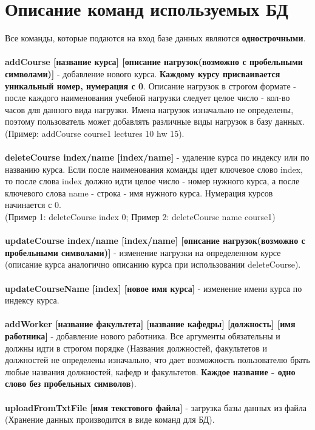 \documentclass[11pt]{article}
\begin{document}
\section{Описание команд используемых БД}
Все команды, которые подаются на вход базе данных являются \textbf{однострочными}.\\\\
\textbf{addCourse [название курса] [описание нагрузок(возможно с пробельными символами)]} - добавление нового курса. \textbf{Каждому курсу присваивается уникальный номер, нумерация с 0}. Описание нагрузок в строгом формате - после каждого наименования учебной нагрузки следует целое число - кол-во часов для данного вида нагрузки. Имена нагрузок изначально не определены, поэтому пользователь может добавлять различные виды нагрузок в базу данных. (Пример: addCourse course1 lectures 10 hw 15).\\\\
\textbf{deleteCourse index/name [index/name]} - удаление курса по индексу или по названию курса. Если после наименования команды идет ключевое слово index, то после слова index должно идти целое число - номер нужного курса, а после ключевого слова name - строка - имя нужного курса. Нумерация курсов начинается с 0.\\(Пример 1: deleteCourse index 0; Пример 2: deleteCourse name course1) \\\\
\textbf{updateCourse index/name [index/name] [описание нагрузок(возможно с пробельными символами)]} - изменение нагрузки на определенном курсе (описание курса аналогично описанию курса при использовании deleteCourse).\\\\
\textbf{updateCourseName [index] [новое имя курса]} - изменение имени курса по индексу курса.\\\\
\textbf{addWorker [название факультета] [название кафедры] [должность] [имя работника]} - добавление нового работника. Все аргументы обязательны и должны идти в строгом порядке (Названия должностей, факультетов и должностей не определены изначально, что дает возможность пользователю брать любые названия должностей, кафедр и факультетов. \textbf{Каждое название - одно слово без пробельных символов}).\\\\
\textbf{uploadFromTxtFile [имя текстового файла]} - загрузка базы данных из файла (Хранение данных производится в виде команд для БД).\\\\
\end{document}
